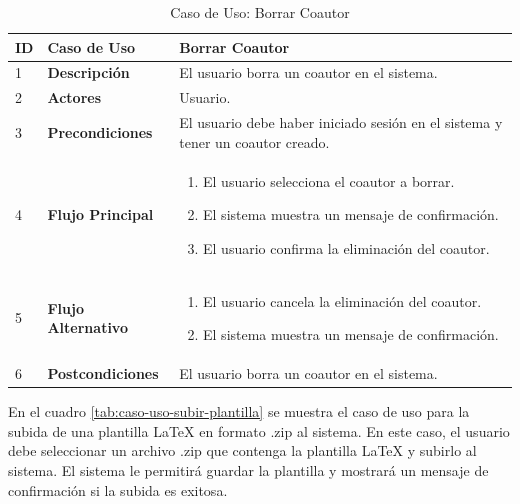 \begin{table}[H]
    \centering
        \begin{tabular}{|p{0.5cm}|p{3.5cm}|p{10cm}|}
        \hline
        \textbf{ID} & \textbf{Caso de Uso} & \textbf{Borrar Coautor} \\
        \hline
        1 & \textbf{Descripción} & El usuario borra un coautor en el sistema. \\
        \hline
        2 & \textbf{Actores} & Usuario. \\
        \hline
        3 & \textbf{Precondiciones} & El usuario debe haber iniciado sesión en el sistema y tener un coautor creado. \\
        \hline
        4 & \textbf{Flujo Principal} & 
        \begin{enumerate}
            \item El usuario selecciona el coautor a borrar.
            \item El sistema muestra un mensaje de confirmación.
            \item El usuario confirma la eliminación del coautor.
        \end{enumerate} \\
        \hline
        5 & \textbf{Flujo Alternativo} & 
        \begin{enumerate}
            \item El usuario cancela la eliminación del coautor.
            \item El sistema muestra un mensaje de confirmación.
        \end{enumerate} \\
        \hline
        6 & \textbf{Postcondiciones} & El usuario borra un coautor en el sistema. \\
        \hline
    \end{tabular}
    \caption{Caso de Uso: Borrar Coautor}
    \label{tab:caso-uso-borrar-coautor}
\end{table}

En el cuadro \ref{tab:caso-uso-subir-plantilla} se muestra el caso de uso para la subida de una plantilla LaTeX en formato .zip al sistema. En este caso, el usuario debe seleccionar un archivo .zip que contenga la plantilla LaTeX y subirlo al sistema. El sistema le permitirá guardar la plantilla y mostrará un mensaje de confirmación si la subida es exitosa.

